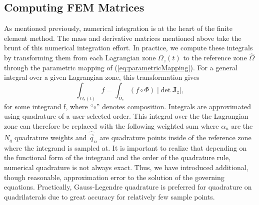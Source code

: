 \subsection{Computing FEM Matrices}
As mentioned previously, numerical integration is at the heart of the finite element method. The mass and derivative matrices mentioned above take the brunt of this numerical integration effort. In practice, we compute these integrals by transforming them from each Lagrangian zone $\Omega_z(t)$ to the reference zone $\hat{\Omega}$ through the parametric mapping of (\ref{eq:parametricMapping}). For a general integral over a given Lagrangian zone, this transformation gives
\begin{displaymath}
  \int_{\Omega_z (t)} f = \int_{\hat \Omega _z} (f \circ \Phi) \; |\det \mathbf{J}_z|,
\end{displaymath}
for some integrand f, where ``$\circ$'' denotes composition. Integrals are approximated using quadrature of a user-selected order. This integral over the the Lagrangian zone can therefore be replaced with the following weighted sum
where $\alpha_n$ are the $N_q$ quadrature weights and $\hat{\vec q}_n$ are
quadrature points inside of the reference zone where the integrand is sampled
at. It is important to realize that depending on the functional form of the integrand and the order of the quadrature rule, numerical quadrature is not always exact. Thus, we have introduced additional, though reasonable, approximation error to the solution of the governing equations. Practically, Gauss-Legendre quadrature is preferred for quadrature on quadrilaterals due to great accuracy for relatively few sample points. 

